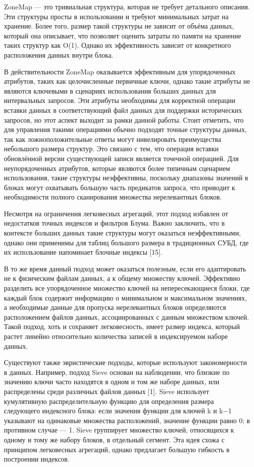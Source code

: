 ZoneMap — это тривиальная структура, которая не требует детального описания. Эти структуры просты в использовании и требуют минимальных затрат на хранение. Более того, размер такой структуры не зависит от объёма данных, который она описывает, что позволяет оценить затраты по памяти на хранение таких структур как O(1). Однако их эффективность зависит от конкретного расположения данных внутри блока.

В действительности ZoneMap оказывается эффективным для упорядоченных атрибутов, таких как целочисленные первичные ключи, однако такие атрибуты не являются ключевыми в сценариях использования больших данных для интервальных запросов. Эти атрибуты необходимы для корректной операции вставки данных в соответствующий файл данных для поддержки исторических запросов, но этот аспект выходит за рамки данной работы. Стоит отметить, что для управления такими операциями обычно подходят точные структуры данных, так как ложноположительные ответы могут нивелировать преимущества небольшого размера структур. Это связано с тем, что операция вставки обновлённой версии существующей записи является точечной операцией. Для неупорядоченных атрибутов, которые являются более типичным сценарием использования, такие структуры неэффективны, поскольку диапазоны значений в блоках могут охватывать большую часть предикатов запроса, что приводит к необходимости полного сканирования множества нерелевантных блоков.

Несмотря на ограничения легковесных агрегаций, этот подход избавлен от недостатков точных индексов и фильтров Блума. Важно заключить, что в контексте больших данных такие структуры могут оказаться неэффективными, однако они применимы для таблиц большого размера в традиционных СУБД, где их использование напоминает блочные индексы [15].

В то же время данный подход может оказаться полезным, если его адаптировать не к физическим файлам данных, а к общему множеству ключей. Эффективно разделить все упорядоченное множество ключей на непересекающиеся блоки, где каждый блок содержит информацию о минимальном и максимальном значениях, а необходимые данные для пропуска нерелевантных блоков определяются расположением файлов данных, ассоциированных с данным множеством ключей. Такой подход, хоть и сохраняет легковесность, имеет размер индекса, который растет линейно относительно количества записей в индексируемом наборе данных.

Существуют также эвристические подходы, которые используют закономерности в данных. Например, подход Sieve основан на наблюдении, что близкие по значению ключи часто находятся в одном и том же наборе данных, или распределены среди различных файлов данных [1]. Sieve использует кумулятивную распределительную функцию для определения размера следующего индексного блока: если значения функции для ключей k и k−1 указывают на одинаковые множества расположений, значение функции равно 0; в противном случае — 1. Sieve группирует множество ключей, относящихся к одному и тому же набору блоков, в отдельный сегмент. Эта идея схожа с принципом легковесных агрегаций, однако предлагает большую гибкость в построении индексов.

